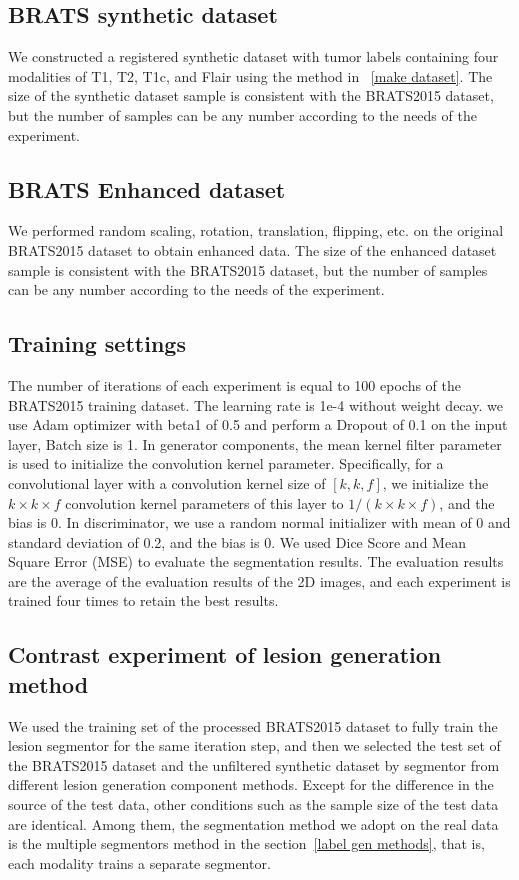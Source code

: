 \documentclass[letterpaper]{article} %
\begin{document}
\subsection{BRATS synthetic dataset}
We constructed a registered synthetic dataset with tumor labels containing four modalities of T1, T2, T1c, and Flair using the method in ~\ref{make dataset}. The size of the synthetic dataset sample is consistent with the BRATS2015 dataset, but the number of samples can be any number according to the needs of the experiment.

\subsection{BRATS Enhanced dataset}
We performed random scaling, rotation, translation, flipping, etc. on the original BRATS2015 dataset to obtain enhanced data. The size of the enhanced dataset sample is consistent with the BRATS2015 dataset, but the number of samples can be any number according to the needs of the experiment.

\subsection{Training settings}
The number of iterations of each experiment is equal to 100 epochs of the BRATS2015 training dataset. The learning rate is 1e-4 without weight decay.  we use Adam optimizer with beta1 of 0.5 and perform a Dropout of 0.1 on the input layer, Batch size is 1. In generator components, the mean kernel filter parameter is used to initialize the convolution kernel parameter. Specifically, for a convolutional layer with a convolution kernel size of $[k,k,f]$, we initialize the $k\times k\times f$ convolution kernel parameters of this layer to $1/(k \times k\times f)$, and the bias is 0. In discriminator, we use a random normal initializer with mean of 0 and standard deviation of 0.2, and the bias is 0. We used Dice Score \cite{95dice1945measures} and Mean Square Error (MSE)\cite{94prasad1990the} to evaluate the segmentation results. The evaluation results are the average of the evaluation results of the 2D images, and each experiment is trained four times to retain the best results.

\subsection{Contrast experiment of lesion generation method}
\label{label gen methods tests}
We used the training set of the processed BRATS2015 dataset to fully train the lesion segmentor for the same iteration step, and then we selected the test set of the BRATS2015 dataset and  the unfiltered synthetic dataset by segmentor from different lesion generation component methods. Except for the difference in the source of the test data, other conditions such as the sample size of the test data are identical. Among them, the segmentation method we adopt on the real data is the multiple segmentors method in the section~\ref{label gen methods}, that is, each modality trains a separate segmentor.
\end{document}
